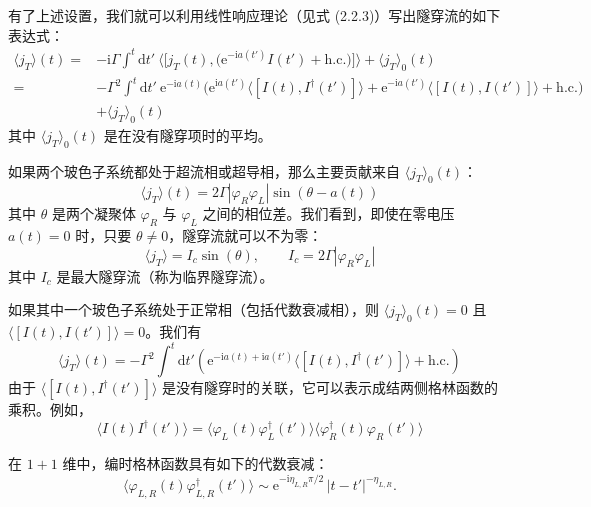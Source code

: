 有了上述设置，我们就可以利用线性响应理论（见式 (2.2.3)）写出隧穿流的如下表达式：
\begin{align*}
\langle j_{T}\rangle(t) ={}& -\mathrm{i}\Gamma\int^{t}\mathrm{d}t'\ \Big\langle\big[j_{T}(t), \big(\mathrm{e}^{-\mathrm{i}a(t')}I(t') + \text{h.c.}\big)\big]\Big\rangle + \langle j_{T}\rangle_{0}(t)\\
={}& -\Gamma^{2}\int^{t}\mathrm{d}t'\ \mathrm{e}^{-\mathrm{i}a(t)}\Big(\mathrm{e}^{\mathrm{i}a(t')}\big\langle[I(t), I^{\dagger}(t')]\big\rangle + \mathrm{e}^{-\mathrm{i}a(t')}\big\langle[I(t), I(t')]\big\rangle + \text{h.c.}\Big)\\
& + \langle j_{T}\rangle_{0}(t)
\end{align*}
其中 $\langle j_{T}\rangle_{0}(t)$ 是在没有隧穿项时的平均。

如果两个玻色子系统都处于超流相或超导相，那么主要贡献来自 $\langle j_{T}\rangle_{0}(t)$：
\begin{equation*}
\langle j_{T}\rangle(t) = 2\Gamma|\varphi_{R}\varphi_{L}|\sin(\theta - a(t))
\end{equation*}
其中 $\theta$ 是两个凝聚体 $\varphi_{R}$ 与 $\varphi_{L}$ 之间的相位差。我们看到，即使在零电压 $a(t)=0$ 时，只要 $\theta\neq0$，隧穿流就可以不为零：
\begin{equation*}
\langle j_{T}\rangle = I_{c}\sin(\theta), \qquad I_{c} = 2\Gamma|\varphi_{R}\varphi_{L}|
\end{equation*}
其中 $I_{c}$ 是最大隧穿流（称为临界隧穿流）。

如果其中一个玻色子系统处于正常相（包括代数衰减相），则 $\langle j_{T}\rangle_{0}(t)=0$ 且 $\langle[I(t), I(t')]\rangle=0$。我们有
\begin{equation*}
\langle j_{T}\rangle(t) = -\Gamma^{2}\int^{t}\mathrm{d}t'\left(\mathrm{e}^{-\mathrm{i}a(t)+\mathrm{i}a(t')}\big\langle[I(t), I^{\dagger}(t')]\big\rangle + \text{h.c.}\right) \tag{3.7.15}
\end{equation*}
由于 $\big\langle[I(t), I^{\dagger}(t')]\big\rangle$ 是没有隧穿时的关联，它可以表示成结两侧格林函数的乘积。例如，
\begin{equation*}
\big\langle I(t)I^{\dagger}(t')\big\rangle = \big\langle\varphi_{L}(t)\varphi_{L}^{\dagger}(t')\big\rangle\big\langle\varphi_{R}^{\dagger}(t)\varphi_{R}(t')\big\rangle
\end{equation*}

在 $1+1$ 维中，编时格林函数具有如下的代数衰减：
\begin{equation*}
\big\langle\varphi_{L,R}(t)\varphi_{L,R}^{\dagger}(t')\big\rangle \sim \mathrm{e}^{-\mathrm{i}\eta_{L,R}\pi/2}\,|t-t'|^{-\eta_{L,R}}.
\end{equation*}

